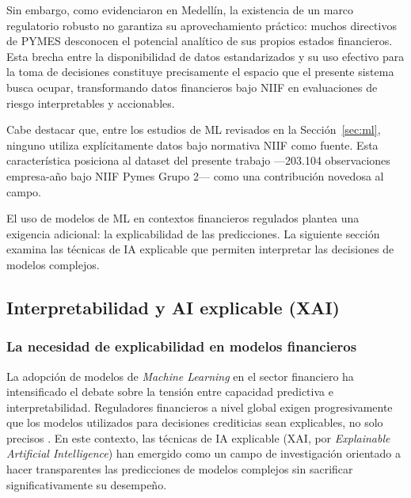 \documentclass[12pt, letterpaper]{article}
\begin{document}
Sin embargo, como evidenciaron \citet{CardonaZuleta2025} en Medell\'in, la existencia de un marco regulatorio robusto no garantiza su aprovechamiento pr\'actico: muchos directivos de PYMES desconocen el potencial anal\'itico de sus propios estados financieros. Esta brecha entre la disponibilidad de datos estandarizados y su uso efectivo para la toma de decisiones constituye precisamente el espacio que el presente sistema busca ocupar, transformando datos financieros bajo NIIF en evaluaciones de riesgo interpretables y accionables.

Cabe destacar que, entre los estudios de ML revisados en la Secci\'on~\ref{sec:ml}, ninguno utiliza expl\'icitamente datos bajo normativa NIIF como fuente. Esta caracter\'istica posiciona al dataset del presente trabajo ---203.104 observaciones empresa-a\~no bajo NIIF Pymes Grupo 2--- como una contribuci\'on novedosa al campo.

El uso de modelos de ML en contextos financieros regulados plantea una exigencia adicional: la explicabilidad de las predicciones. La siguiente secci\'on examina las t\'ecnicas de IA explicable que permiten interpretar las decisiones de modelos complejos.

\subsection{Interpretabilidad y AI explicable (XAI)}
\label{sec:xai}

\subsubsection{La necesidad de explicabilidad en modelos financieros}

La adopci\'on de modelos de \textit{Machine Learning} en el sector financiero ha intensificado el debate sobre la tensi\'on entre capacidad predictiva e interpretabilidad. Reguladores financieros a nivel global exigen progresivamente que los modelos utilizados para decisiones crediticias sean explicables, no solo precisos \citep{Bazarbash2019}. En este contexto, las t\'ecnicas de IA explicable (XAI, por \textit{Explainable Artificial Intelligence}) han emergido como un campo de investigaci\'on orientado a hacer transparentes las predicciones de modelos complejos sin sacrificar significativamente su desempe\~no.
\end{document}
